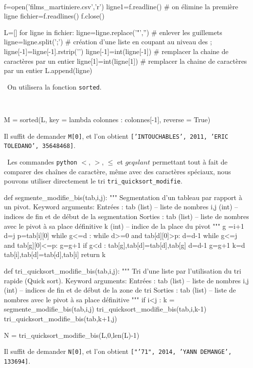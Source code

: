 \ifprof
\begin{corrige}

\question\
\begin{python}
f=open('films_martiniere.csv','r')
ligne1=f.readline() # on élimine la première ligne
fichier=f.readlines()
f.close()

L=[]
for ligne in fichier:
    ligne=ligne.replace('"','') # enlever les guillemets
    ligne=ligne.split(';') # création d'une liste en coupant au niveau des ;
    ligne[-1]=ligne[-1].rstrip('\n')
    ligne[-1]=int(ligne[-1]) # remplacer la chaine de caractères par un entier
    ligne[1]=int(ligne[1]) # remplacer la chaine de caractères par un entier
    L.append(ligne)
\end{python}

\question\ On utilisera la fonction \texttt{sorted}.

\question\ 
\begin{python}
M = sorted(L, key = lambda colonnes : colonnes[-1], reverse = True)
\end{python}

Il suffit de demander \texttt{M[0]}, et l'on obtient \texttt{['INTOUCHABLES', 2011, 'ERIC TOLEDANO', 35648468]}.

\question\ Les commandes \texttt{python} $<$, $>$, $\leqslant$ et $geqslant$ permettant tout à fait de comparer des 
chaînes de caractère, même avec des caractères spéciaux, nous pouvons utiliser directement le tri 
\texttt{tri_quicksort_modifie}.

\begin{python}
def segmente_modifie_bis(tab,i,j):
    """
    Segmentation d'un tableau par rapport à un pivot.
    Keyword arguments: 
    Entrées :
        tab (list) -- liste de nombres
        i,j (int) -- indices de fin et de début de la segmentation
    Sorties :    
        tab (list) -- liste de nombres avec le pivot à sa place définitive
        k (int) -- indice de la place du pivot
    """
    g =i+1
    d=j
    p=tab[i][0]
    while g<=d :
        while d>=0 and tab[d][0]>p:
            d=d-1
        while g<=j and tab[g][0]<=p:
            g=g+1
        if g<d :
            tab[g],tab[d]=tab[d],tab[g]
            d=d-1
            g=g+1
    k=d
    tab[i],tab[d]=tab[d],tab[i]
    return k
    
def tri_quicksort_modifie_bis(tab,i,j):
    """
    Tri d'une liste par l'utilisation du tri rapide (Quick sort).
    Keyword arguments:
    Entrées :
        tab (list) -- liste de nombres
        i,j (int) -- indices de fin et de début de la zone de tri
    Sorties :    
        tab (list) -- liste de nombres avec le pivot à sa place définitive
    """
    if i<j :
        k = segmente_modifie_bis(tab,i,j)
        tri_quicksort_modifie_bis(tab,i,k-1)
        tri_quicksort_modifie_bis(tab,k+1,j)

N = tri_quicksort_modifie_bis(L,0,len(L)-1)
\end{python}

Il suffit de demander \texttt{N[0]}, et l'on obtient \texttt{["'71", 2014, 'YANN DEMANGE', 133694]}.

\setcounter{question}{0}
\end{corrige}
\else\fi